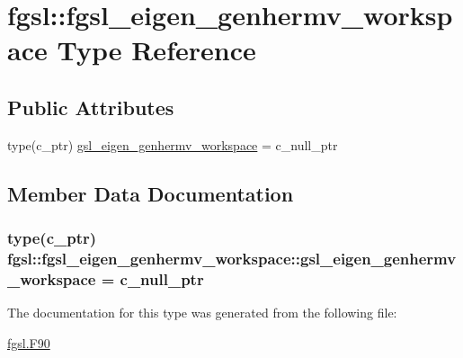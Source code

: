 \hypertarget{structfgsl_1_1fgsl__eigen__genhermv__workspace}{\section{fgsl\-:\-:fgsl\-\_\-eigen\-\_\-genhermv\-\_\-workspace Type Reference}
\label{structfgsl_1_1fgsl__eigen__genhermv__workspace}
}
\subsection*{Public Attributes}
\begin{DoxyCompactItemize}
\item 
type(c\-\_\-ptr) \hyperlink{structfgsl_1_1fgsl__eigen__genhermv__workspace_a27c02e480d2679e5e01213ce48ceb989}{gsl\-\_\-eigen\-\_\-genhermv\-\_\-workspace} = c\-\_\-null\-\_\-ptr
\end{DoxyCompactItemize}


\subsection{Member Data Documentation}
\hypertarget{structfgsl_1_1fgsl__eigen__genhermv__workspace_a27c02e480d2679e5e01213ce48ceb989}{
\subsubsection[{gsl\-\_\-eigen\-\_\-genhermv\-\_\-workspace}]{\setlength{\rightskip}{0pt plus 5cm}type(c\-\_\-ptr) fgsl\-::fgsl\-\_\-eigen\-\_\-genhermv\-\_\-workspace\-::gsl\-\_\-eigen\-\_\-genhermv\-\_\-workspace = c\-\_\-null\-\_\-ptr}}\label{structfgsl_1_1fgsl__eigen__genhermv__workspace_a27c02e480d2679e5e01213ce48ceb989}


The documentation for this type was generated from the following file\-:\begin{DoxyCompactItemize}
\item 
\hyperlink{fgsl_8F90}{fgsl.\-F90}\end{DoxyCompactItemize}
